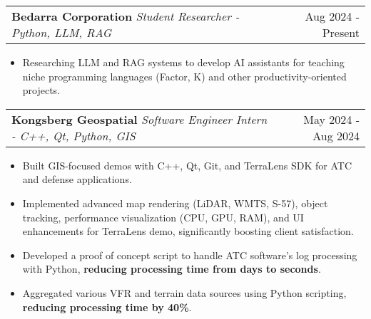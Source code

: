 \documentclass[letterpaper,11pt]{article}
\makeatletter
\newcommand{\resumeItem}[1]{
  \item\small{
    {#1 \vspace{-3pt}}
  }
}
\newcommand{\resumeSubheading}[3]{
    \item
    \begin{tabular*}{0.97\textwidth}[t]{l@{\extracolsep{\fill}}r}
      \textbf{#1} \textbar \textit{ #2} & #3 \\
    \end{tabular*}\vspace{-9pt}
}
\newcommand{\resumeItemListStart}{\begin{itemize}}
\newcommand{\resumeItemListEnd}{\end{itemize}\vspace{-5pt}}
\makeatother
\begin{document}
      \resumeSubheading
      {Bedarra Corporation}{Student Researcher - Python, LLM, RAG}{Aug 2024 - Present}
      \resumeItemListStart
      \resumeItem{Researching LLM and RAG systems to develop AI assistants for teaching niche programming languages (Factor, K) and other productivity-oriented projects.}
      \resumeItemListEnd

      \resumeSubheading
      {Kongsberg Geospatial}{Software Engineer Intern - C++, Qt, Python, GIS}{May 2024 - Aug 2024}
      \resumeItemListStart
      \resumeItem{Built GIS-focused demos with C++, Qt, Git, and TerraLens SDK for ATC and defense applications.}
      \resumeItem{Implemented advanced map rendering (LiDAR, WMTS, S-57), object tracking, performance visualization (CPU, GPU, RAM), and UI enhancements for TerraLens demo, significantly boosting client satisfaction.}
        \resumeItem{Developed a proof of concept script to handle ATC software's log processing with Python, \textbf{reducing processing time from days to seconds}.}
        \resumeItem{Aggregated various VFR and terrain data sources using Python scripting, \textbf{reducing processing time by 40\%}.}
      \resumeItemListEnd
\end{document}
